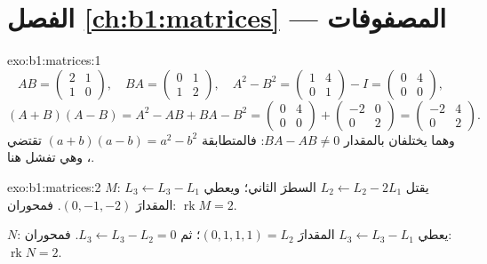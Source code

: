 \section*{الفصل \ref{ch:b1:matrices} --- المصفوفات}

\begin{solution}{exo:b1:matrices:1}
\[
AB = \begin{pmatrix} 2 & 1\\ 1 & 0\end{pmatrix},
\quad
BA = \begin{pmatrix} 0 & 1\\ 1 & 2\end{pmatrix},
\quad
A^2 - B^2 = \begin{pmatrix} 1 & 4\\ 0 & 1\end{pmatrix} - I
= \begin{pmatrix} 0 & 4\\ 0 & 0\end{pmatrix},
\]
\[
(A+B)(A-B) = A^2 - AB + BA - B^2
= \begin{pmatrix} 0 & 4\\ 0 & 0\end{pmatrix} +
\begin{pmatrix} -2 & 0\\ 0 & 2 \end{pmatrix}
= \begin{pmatrix} -2 & 4\\ 0 & 2\end{pmatrix}.
\]
وهما يختلفان بالمقدار $BA - AB \neq 0$: فالمتطابقة $(a+b)(a-b) = a^2 -
b^2$ تقتضي ، وهي تفشل هنا.
\end{solution}

\begin{solution}{exo:b1:matrices:2}
$M$: يقتل $L_2 \leftarrow L_2 - 2L_1$ السطرَ الثاني؛ ويعطي $L_3
\leftarrow L_3 - L_1$ المقدارَ $(0, -1, -2)$. فمحوران:
$\operatorname{rk} M = 2$.

$N$: يعطي $L_3 \leftarrow L_3 - L_1$ المقدارَ $(0,1,1,1) = L_2$؛ ثم $L_3
\leftarrow L_3 - L_2 = 0$. فمحوران: $\operatorname{rk} N = 2$.
\end{solution}

